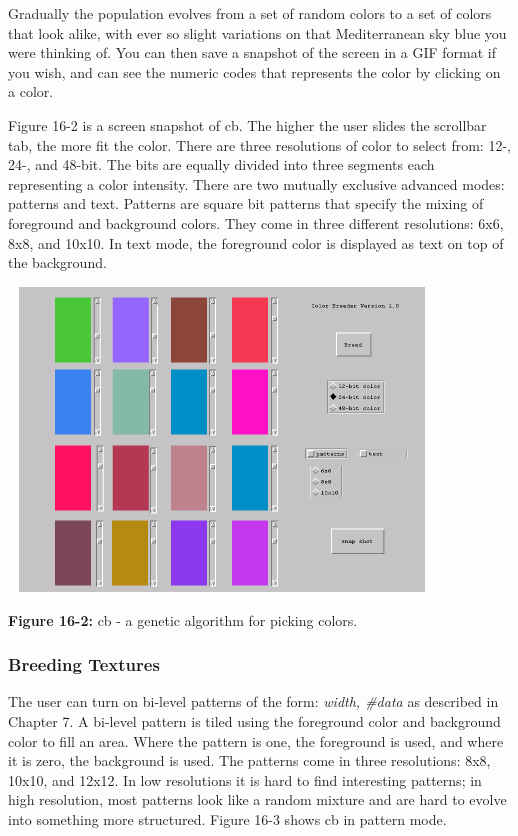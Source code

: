 Gradually the population evolves from a set of random colors to a set of
colors that look alike, with ever so slight variations on that
Mediterranean sky blue you were thinking of. You can then save a
snapshot of the screen in a GIF format if you wish, and can see the
numeric codes that represents the color by clicking on a color.

Figure 16-2 is a screen snapshot of \textsf{cb}. The higher the user
slides the scrollbar tab, the more fit the color. There are three
resolutions of color to select from: 12-, 24-, and 48-bit.
The bits are equally divided into three segments each representing a
color intensity. There are two mutually exclusive advanced modes:
patterns and text. Patterns are square bit patterns that specify the
mixing of foreground and background colors. They come in three
different resolutions: 6x6, 8x8, and 10x10. In text mode, the
foreground color is displayed as text on top of the background.

\begin{center}
\includegraphics[width=4.4571in,height=3.1807in]{ub-img/ub-img46.png}
\end{center}

{\sffamily\bfseries Figure 16-2:}
{\sffamily cb - a genetic algorithm for picking colors.}

\subsubsection{Breeding Textures}

The user can turn on bi-level patterns of the form: \textit{width,
\#data} as described in Chapter 7. A bi-level pattern is tiled using
the foreground color and background color to fill an area. Where the
pattern is one, the foreground is used, and where it is zero, the
background is used. The patterns come in three resolutions: 8x8, 10x10,
and 12x12. In low resolutions it is hard to find interesting patterns;
in high resolution, most patterns look like a random mixture and are
hard to evolve into something more structured. Figure 16-3 shows
\textsf{cb} in pattern mode.

